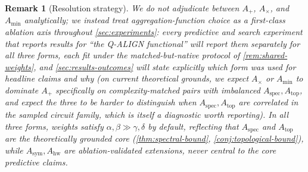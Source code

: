 \documentclass[11pt]{article}
\newtheorem{remark}[theorem]{Remark}
\newcommand{\Aspec}{A_{\mathrm{spec}}}
\newcommand{\Atop}{A_{\mathrm{top}}}
\newcommand{\Asym}{A_{\mathrm{sym}}}
\newcommand{\Ahw}{A_{\mathrm{hw}}}
\begin{document}
\begin{remark}[Resolution strategy]
We do not adjudicate between $A_+$, $A_\times$, and $A_{\min}$ analytically; we instead treat aggregation-function choice as a first-class ablation axis throughout \cref{sec:experiments}: every predictive and search experiment that reports results for ``the Q-ALIGN functional'' will report them separately for all three forms, each fit under the matched-but-native protocol of \cref{rem:shared-weights}, and \cref{sec:results-outcomes} will state explicitly which form was used for headline claims and why (on current theoretical grounds, we expect $A_\times$ or $A_{\min}$ to dominate $A_+$ specifically on complexity-matched pairs with imbalanced $\Aspec,\Atop$, and expect the three to be harder to distinguish when $\Aspec,\Atop$ are correlated in the sampled circuit family, which is itself a diagnostic worth reporting). In all three forms, weights satisfy $\alpha,\beta \gg \gamma,\delta$ by default, reflecting that $\Aspec$ and $\Atop$ are the theoretically grounded core (\cref{thm:spectral-bound}, \cref{conj:topological-bound}), while $\Asym,\Ahw$ are ablation-validated extensions, never central to the core predictive claims.
\end{remark}
\end{document}
